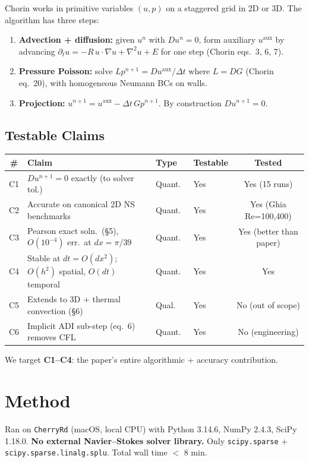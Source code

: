 \documentclass[11pt]{article}
\begin{document}
Chorin works in primitive variables $(u,p)$ on a staggered grid in 2D or 3D. The algorithm has three steps:

\begin{enumerate}
    \item \textbf{Advection + diffusion:} given $u^n$ with $Du^n = 0$, form auxiliary $u^{\mathrm{aux}}$ by advancing $\partial_t u = -R\, u\cdot\nabla u + \nabla^2 u + E$ for one step (Chorin eqs.\ 3, 6, 7).
    \item \textbf{Pressure Poisson:} solve $L p^{n+1} = D u^{\mathrm{aux}}/\Delta t$ where $L = DG$ (Chorin eq.\ 20), with homogeneous Neumann BCs on walls.
    \item \textbf{Projection:} $u^{n+1} = u^{\mathrm{aux}} - \Delta t\, G p^{n+1}$. By construction $D u^{n+1} = 0$.
\end{enumerate}

\subsection{Testable Claims}

\begin{longtable}{@{}clllc@{}}
\toprule
\# & Claim & Type & Testable & Tested \\
\midrule
C1 & $Du^{n+1} = 0$ exactly (to solver tol.) & Quant.\ & Yes & Yes (15 runs) \\
C2 & Accurate on canonical 2D NS benchmarks & Quant.\ & Yes & Yes (Ghia Re=100,400) \\
C3 & Pearson exact soln.\ (\S 5), $O(10^{-4})$ err.\ at $dx=\pi/39$ & Quant.\ & Yes & Yes (better than paper) \\
C4 & Stable at $dt = O(dx^2)$; $O(h^2)$ spatial, $O(dt)$ temporal & Quant.\ & Yes & Yes \\
C5 & Extends to 3D + thermal convection (\S 6) & Qual.\ & Yes & No (out of scope) \\
C6 & Implicit ADI sub-step (eq.\ 6) removes CFL & Quant.\ & Yes & No (engineering) \\
\bottomrule
\end{longtable}

We target \textbf{C1--C4}: the paper's entire algorithmic + accuracy contribution.

\section{Method}

Ran on \texttt{CherryRd} (macOS, local CPU) with Python 3.14.6, NumPy 2.4.3, SciPy 1.18.0. \textbf{No external Navier--Stokes solver library.} Only \texttt{scipy.sparse} + \texttt{scipy.sparse.linalg.splu}. Total wall time $<$ 8 min.
\end{document}
